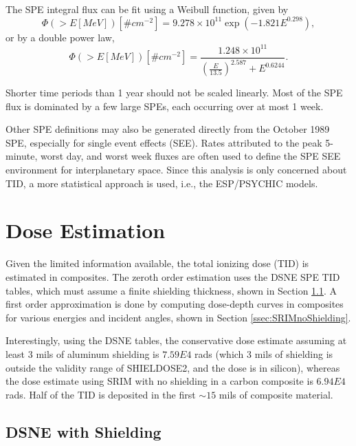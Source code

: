 \documentclass{hitec}
\begin{document}
The SPE integral flux can be fit using a Weibull function, given by
\begin{equation}
\Phi(>E[MeV]) [\# cm^{-2}] = 9.278\times 10^{11} \exp\left(-1.821E^{0.298}\right),
\end{equation}
or by a double power law,
\begin{equation}
\Phi(>E[MeV]) [\# cm^{-2}] = \frac{1.248\times 10^{11}}{\left(\frac{E}{13.5}\right)^{2.587} + E^{0.6244}}.
\end{equation}

Shorter time periods than 1 year should not be scaled linearly. Most of the SPE flux is dominated by a few large SPEs, each occurring over at most 1 week.

Other SPE definitions may also be generated directly from the October 1989 SPE, especially for single event effects (SEE). Rates attributed to the peak 5-minute, worst day, and worst week fluxes are often used to define the SPE SEE environment for interplanetary space. Since this analysis is only concerned about TID, a more statistical approach is used, i.e., the ESP/PSYCHIC models.

\section{Dose Estimation}

Given the limited information available, the total ionizing dose (TID) is estimated in composites. The zeroth order estimation uses the DSNE SPE TID tables, which must assume a finite shielding thickness, shown in Section \ref{ssec:DSNEwithShielding}. A first order approximation is done by computing dose-depth curves in composites for various energies and incident angles, shown in Section \ref{ssec:SRIMnoShielding}.

Interestingly, using the DSNE tables, the conservative dose estimate assuming at least 3 mils of aluminum shielding is $7.59E4$ rads (which 3 mils of shielding is outside the validity range of SHIELDOSE2, and the dose is in silicon), whereas the dose estimate using SRIM with no shielding in a carbon composite is $6.94E4$ rads. Half of the TID is deposited in the first $\sim15$ mils of composite material.

\subsection{DSNE with Shielding}\label{ssec:DSNEwithShielding}
\end{document}
